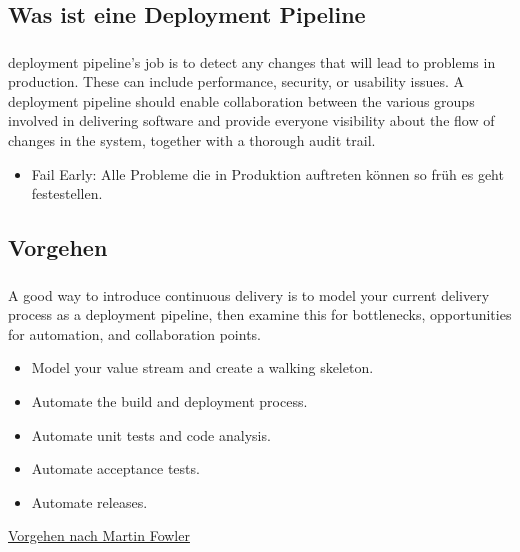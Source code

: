 \documentclass[aspectratio=169]{beamer}
\begin{document}
\begin{frame}

\subsection{Was ist eine Deployment Pipeline}
\frametitle{\subsecname}\framesubtitle{\secname}
deployment pipeline's job is to detect any changes that will lead to problems in production. These can include performance, security, or usability issues. A deployment pipeline should enable collaboration between the various groups involved in delivering software and provide everyone visibility about the flow of changes in the system, together with a thorough audit trail.
\begin{itemize}[label={$\bullet$}]
\item Fail Early: Alle Probleme die in Produktion auftreten können so früh es geht festestellen.
\end{itemize}
\end{frame}


\subsection{Vorgehen}
\begin{frame}
\frametitle{\secname}\framesubtitle{\subsecname}
A good way to introduce continuous delivery is to model your current delivery process as a deployment pipeline, then examine this for bottlenecks, opportunities for automation, and collaboration points.
\begin{itemize}[label={$\bullet$}]
\item Model your value stream and create a walking skeleton.
\item Automate the build and deployment process.
\item Automate unit tests and code analysis.
\item Automate acceptance tests.
\item Automate releases.
\end{itemize}

\href{http://www.informit.com/articles/article.aspx?p=1621865&seqNum=8}{Vorgehen nach Martin Fowler}
\end{frame}
\end{document}
